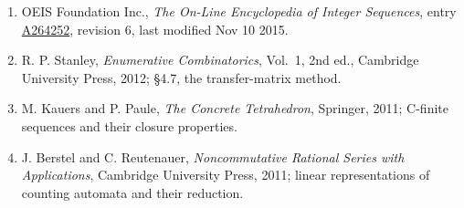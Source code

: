 \documentclass[11pt]{article}
\theoremstyle{definition}
\begin{document}
\begin{enumerate}

\item OEIS Foundation Inc., \emph{The On-Line Encyclopedia of Integer Sequences}, entry \href{https://oeis.org/A264252}{A264252}, revision 6, last modified Nov 10 2015.

\item R. P. Stanley, \emph{Enumerative Combinatorics}, Vol.~1, 2nd ed., Cambridge University Press, 2012; \S4.7, the transfer-matrix method.

\item M. Kauers and P. Paule, \emph{The Concrete Tetrahedron}, Springer, 2011; C-finite sequences and their closure properties.

\item J. Berstel and C. Reutenauer, \emph{Noncommutative Rational Series with Applications}, Cambridge University Press, 2011; linear representations of counting automata and their reduction.

\end{enumerate}
\end{document}
